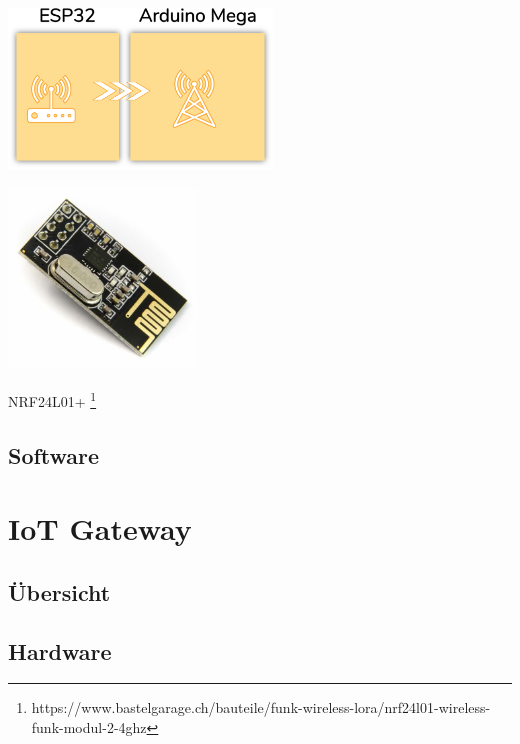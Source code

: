 \documentclass[
  10pt, %
  a4paper, %
  twoside, %
  openright, %
  numbers=noenddot, %
  BCOR=5mm, %
  parskip=half*, %
  thesis, %
]{bfhbook}
\begin{document}
\begin{center}
    \begin{minipage}[b]{0.45\textwidth}
        \centering
        \includegraphics[width=7cm]{Bilder/ESP32-Arduino.png} %
        \captionsetup{justification=centering}
    \end{minipage}\hfill
    \begin{minipage}[b]{0.45\textwidth}
        \centering
        \includegraphics[width=5cm]{Bilder/NRF24.jpg} %
        \captionsetup{justification=centering}
    \end{minipage}
\end{center}
NRF24L01+ \footnote{https://www.bastelgarage.ch/bauteile/funk-wireless-lora/nrf24l01-wireless-funk-modul-2-4ghz}
 
 \section{Software}

%
\chapter{IoT Gateway}
\section{Übersicht}
\section{Hardware}
\end{document}
